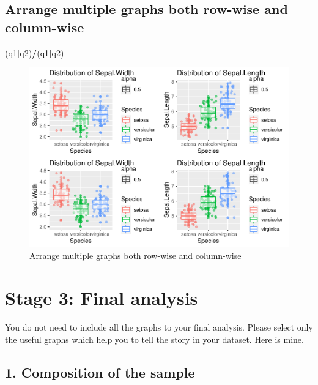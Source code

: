\documentclass[]{article}
\newenvironment{Shaded}{\begin{snugshade}}{\end{snugshade}}
\newcommand{\NormalTok}[1]{#1}
\newcommand{\OperatorTok}[1]{\textcolor[rgb]{0.81,0.36,0.00}{\textbf{#1}}}
\begin{document}
\newpage

\hypertarget{arrange-multiple-graphs-both-row-wise-and-column-wise}{%
\subsection{Arrange multiple graphs both row-wise and
column-wise}\label{arrange-multiple-graphs-both-row-wise-and-column-wise}}

\begin{Shaded}
\begin{Highlighting}[]
\NormalTok{(q1}\OperatorTok{|}\NormalTok{q2)}\OperatorTok{/}\NormalTok{(q1}\OperatorTok{|}\NormalTok{q2)}
\end{Highlighting}
\end{Shaded}

\begin{figure}
\centering
\includegraphics{Week3Answers_files/figure-latex/unnamed-chunk-22-1.pdf}
\caption{Arrange multiple graphs both row-wise and column-wise}
\end{figure}

\newpage

\hypertarget{stage-3-final-analysis}{%
\section{Stage 3: Final analysis}\label{stage-3-final-analysis}}

You do not need to include all the graphs to your final analysis. Please
select only the useful graphs which help you to tell the story in your
dataset. Here is mine.

\hypertarget{composition-of-the-sample}{%
\subsection{1. Composition of the
sample}\label{composition-of-the-sample}}
\end{document}
